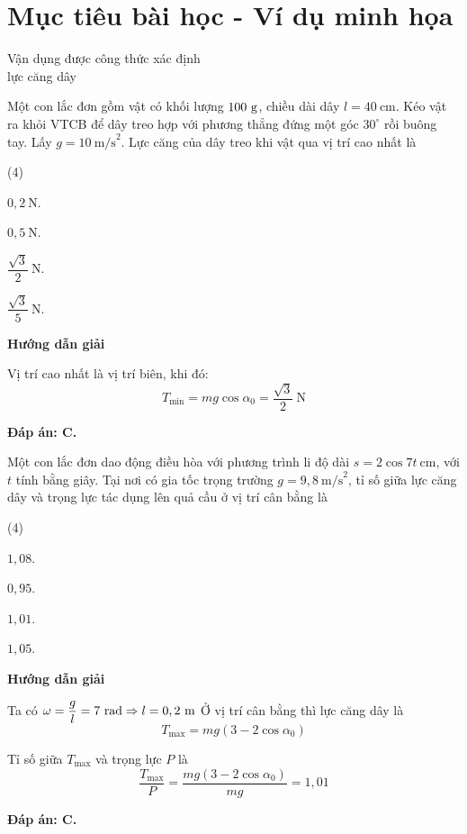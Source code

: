 \section{Mục tiêu bài học - Ví dụ minh họa}
\begin{dang}{Vận dụng được công thức xác định\\ lực căng dây}
	{
		Một con lắc đơn gồm vật có khối lượng $100\ \text g$, chiều dài dây $l=40\ \text{cm}$. Kéo vật ra khỏi VTCB để dây treo hợp với phương thẳng đứng một góc $30^\circ$ rồi buông tay. Lấy $g=10\ \text{m/s}^2$. Lực căng của dây treo khi vật qua vị trí cao nhất là
		\begin{mcq}(4)
			\item $0,2\ \text{N}$.
			\item $0,5\ \text{N}$.
			\item $\dfrac{\sqrt{3}}{2}\ \text{N}$.
			\item $\dfrac{\sqrt{3}}{5}\ \text{N}$.
		\end{mcq}
	}
	{\begin{center}
			\textbf{Hướng dẫn giải}
		\end{center}
		
		Vị trí cao nhất là vị trí biên, khi đó:
		$$T_{\text{min}} =mg \cos \alpha_0 = \dfrac{\sqrt{3}}{2}\ \text{N}$$
		
		\textbf{Đáp án: C.}
	}
	{
		Một con lắc đơn dao động điều hòa với phương trình li độ dài $s=2 \cos 7t\ \text{cm}$, với $t$ tính bằng giây. Tại nơi có gia tốc trọng trường $g=9,8\ \text{m/s}^2$, tỉ số giữa lực căng dây và trọng lực tác dụng lên quả cầu ở vị trí cân bằng là
		\begin{mcq}(4)
			\item $1,08$.
			\item $0,95$.
			\item $1,01$.
			\item $1,05$.
		\end{mcq}
	}
	{
		\begin{center}
			\textbf{Hướng dẫn giải}
		\end{center}
		Ta có $\omega = \dfrac{g}{l}=7\ \text{rad}\Rightarrow l = 0,2\ \text m$
		Ở vị trí cân bằng thì lực căng dây là
		$$T_{\text{max}} =mg (3 -2 \cos \alpha_0)$$
		
		Tỉ số giữa $T_\text{max}$ và trọng lực $P$ là
		$$\dfrac{T_\text{max}}{P}=\dfrac{mg (3 -2 \cos \alpha_0)}{mg}=1,01$$
		
		\textbf{Đáp án: C.}
	}
\end{dang}
